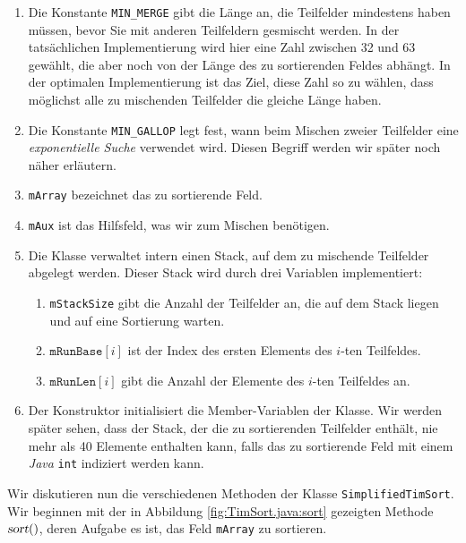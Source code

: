 \begin{enumerate}
\item Die Konstante \texttt{MIN\_MERGE} gibt die L\"ange an, die Teilfelder mindestens haben m\"ussen,
      bevor Sie mit anderen Teilfeldern gesmischt werden. In der tats\"achlichen Implementierung
      wird hier eine Zahl zwischen 32 und 63 gew\"ahlt, die aber noch von der L\"ange des zu
      sortierenden Feldes abh\"angt.  In der optimalen Implementierung ist das Ziel, diese Zahl so zu
      w\"ahlen, dass m\"oglichst alle zu mischenden Teilfelder die gleiche L\"ange haben.
\item Die Konstante \texttt{MIN\_GALLOP} legt fest, wann beim Mischen zweier Teilfelder eine
      \emph{exponentielle Suche} verwendet wird.  Diesen Begriff werden wir sp\"ater noch n\"aher erl\"autern.
\item \texttt{mArray} bezeichnet das zu sortierende Feld.
\item \texttt{mAux}   ist das Hilfsfeld, was wir zum Mischen ben\"otigen.
\item Die Klasse verwaltet intern einen Stack, auf dem zu mischende Teilfelder abgelegt werden.
      Dieser Stack wird durch drei Variablen implementiert:
      \begin{enumerate}
      \item \texttt{mStackSize} gibt die Anzahl der Teilfelder an, die auf dem Stack liegen und
            auf eine Sortierung warten.
      \item $\texttt{mRunBase}[i]$ ist der Index des ersten Elements des $i$-ten Teilfeldes.
      \item $\texttt{mRunLen}[i]$  gibt die Anzahl der Elemente des $i$-ten Teilfeldes an.
      \end{enumerate}
\item Der Konstruktor initialisiert die Member-Variablen der Klasse.  Wir werden sp\"ater sehen,
      dass der Stack, der die zu sortierenden Teilfelder enth\"alt, nie mehr als 40 Elemente enthalten
      kann, falls das zu sortierende Feld mit einem \textsl{Java} \texttt{int} indiziert werden kann.
\end{enumerate}
Wir diskutieren nun die verschiedenen Methoden der Klasse \texttt{SimplifiedTimSort}.
Wir beginnen mit der in Abbildung \ref{fig:TimSort.java:sort} gezeigten Methode $\textsl{sort}()$,
deren Aufgabe es ist, das Feld \texttt{mArray} zu sortieren.


